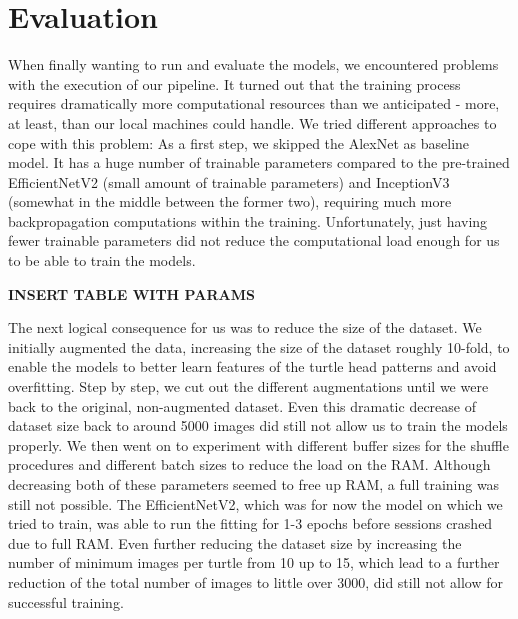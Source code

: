 \section{Evaluation}


When finally wanting to run and evaluate the models, we encountered problems with the execution of our pipeline. It turned out that the training process requires dramatically more computational resources than we anticipated - more, at least, than our local machines could handle. We tried different approaches to cope with this problem: As a first step, we skipped the AlexNet as baseline model. It has a huge number of trainable parameters compared to the pre-trained EfficientNetV2 (small amount of trainable parameters) and InceptionV3 (somewhat in the middle between the former two), requiring much more backpropagation computations within the training. Unfortunately, just having fewer trainable parameters did not reduce the computational load enough for us to be able to train the models.

\textbf{INSERT TABLE WITH PARAMS}

The next logical consequence for us was to reduce the size of the dataset. We initially augmented the data, increasing the size of the dataset roughly 10-fold, to enable the models to better learn features of the turtle head patterns and avoid overfitting. Step by step, we cut out the different augmentations until we were back to the original, non-augmented dataset. Even this dramatic decrease of dataset size back to around 5000 images did still not allow us to train the models properly. We then went on to experiment with different buffer sizes for the shuffle procedures and different batch sizes to reduce the load on the RAM. Although decreasing both of these parameters seemed to free up RAM, a full training was still not possible. The EfficientNetV2, which was for now the model on which we tried to train, was able to run the fitting for 1-3 epochs before sessions crashed due to full RAM. Even further reducing the dataset size by increasing the number of minimum images per turtle from 10 up to 15, which lead to a further reduction of the total number of images to little over 3000, did still not allow for successful training.

